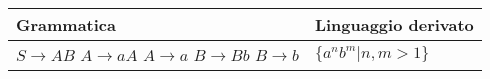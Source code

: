 \documentclass{standalone}
\begin{document}
\begin{tabularx}{\textwidth}{|X |X |}
	\toprule
		Grammatica & Linguaggio derivato \\
    \hline
        $S \to AB$ \newline
        $A \to aA$ \newline
        $A \to a$ \newline
        $B \to Bb$ \newline
        $B \to b$
        & 
        $\{a^n b^m |n,m>1\}$ 
        \\
    \bottomrule
\end{tabularx}
\end{document}
